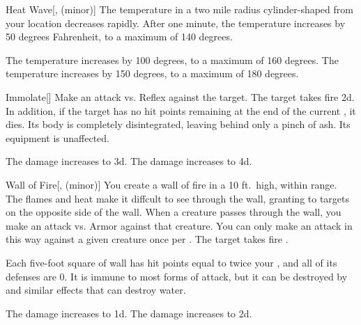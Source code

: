 \lowercase{\hypertarget{spell:Heat Wave}{}}\label{spell:Heat Wave}
\begin{freeability}[Rank 4]{\hypertarget{spell:Heat Wave}{Heat Wave}}[,  (minor)]
\targetrule
The temperature in a two mile radius cylinder-shaped  from your location decreases rapidly.
After one minute, the temperature increases by 50 degrees Fahrenheit, to a maximum of 140 degrees.

\rankline
{} The temperature increases by 100 degrees, to a maximum of 160 degrees.
 The temperature increases by 150 degrees, to a maximum of 180 degrees.
\end{freeability}
\vspace{0.25em}



\lowercase{\hypertarget{spell:Immolate}{}}\label{spell:Immolate}
\begin{freeability}[Rank 4]{\hypertarget{spell:Immolate}{Immolate}}[]
Make an attack vs. Reflex against the target.
\hit The target takes fire  \plus2d.
In addition, if the target has no hit points remaining at the end of the current , it dies.
Its body is completely disintegrated, leaving behind only a pinch of ash.
Its equipment is unaffected.

\rankline
{} The damage increases to  \plus3d.
 The damage increases to  \plus4d.
\end{freeability}
\vspace{0.25em}



\lowercase{\hypertarget{spell:Wall of Fire}{}}\label{spell:Wall of Fire}
\begin{freeability}[Rank 4]{\hypertarget{spell:Wall of Fire}{Wall of Fire}}[,  (minor)]
You create a wall of fire in a 10 ft.\ high, \arealarge {} within \rngmed range.
The flames and heat make it diffcult to see through the wall, granting  to targets on the opposite side of the wall.
When a creature passes through the wall, you make an attack vs. Armor against that creature.
You can only make an attack in this way against a given creature once per .
\hit The target takes fire .

Each five-foot square of wall has hit points equal to twice your , and all of its defenses are 0.
It is immune to most forms of attack, but it can be destroyed by  and similar effects that can destroy water.

\rankline
{} The damage increases to  \plus1d.
 The damage increases to  \plus2d.
\end{freeability}
\vspace{0.25em}


